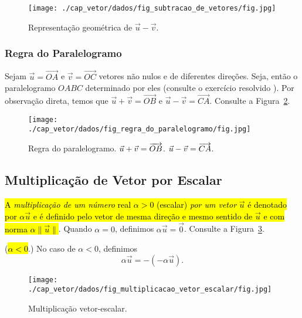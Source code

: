\begin{figure}[h]
  \centering
  \texttt{[image: ./cap\_vetor/dados/fig\_subtracao\_de\_vetores/fig.jpg]}
  \caption{Representação geométrica de $\vec{u} - \vec{v}$.}
  \label{cap_vector_sec_op:fig:subtracao_de_vetores}
\end{figure}

\subsubsection{Regra do Paralelogramo}

Sejam $\vec{u}=\overrightarrow{OA}$ e $\vec{v}=\overrightarrow{OC}$ vetores não nulos e de diferentes direções. Seja, então o paralelogramo $OABC$ determinado por eles (consulte o exercício resolvido ). Por observação direta, temos que $\vec{u}+\vec{v} = \overrightarrow{OB}$ e $\vec{u}-\vec{v} = \overrightarrow{CA}$. Consulte a Figura~\ref{cap_vetor_sec_op:fig:regra_do_paralelogramo}.

\begin{figure}[h]
  \centering
  \texttt{[image: ./cap\_vetor/dados/fig\_regra\_do\_paralelogramo/fig.jpg]}
  \caption{Regra do paralelogramo. $\vec{u}+\vec{v} = \protect\overrightarrow{OB}$. $\vec{u}-\vec{v}=\protect\overrightarrow{CA}$.}
  \label{cap_vetor_sec_op:fig:regra_do_paralelogramo}
\end{figure}  

\subsection{Multiplicação de Vetor por Escalar}

\hl{A \emph{multiplicação de um número} real $\alpha>0$ (escalar) \emph{por um vetor} $\vec{u}$ é denotado por $\alpha\vec{u}$ e é definido pelo vetor de mesma direção e mesmo sentido de $\vec{u}$ e com norma $\alpha\|\vec{u}\|$}. Quando $\alpha = 0$, definimos $\alpha\vec{u}=\vec{0}$. Consulte a Figura~\ref{cap_vetor_sec_op:fig:multiplicacao_vetor_escalar}.

\begin{obs}\normalfont(\hl{$\alpha < 0$}.)
  No caso de $\alpha<0$, definimos
  \begin{equation}
    \alpha\vec{u} = -(-\alpha\vec{u}).
  \end{equation}
\end{obs}

\begin{figure}[h]
  \centering
  \texttt{[image: ./cap\_vetor/dados/fig\_multiplicacao\_vetor\_escalar/fig.jpg]}
  \caption{Multiplicação vetor-escalar.}
  \label{cap_vetor_sec_op:fig:multiplicacao_vetor_escalar}
\end{figure}

